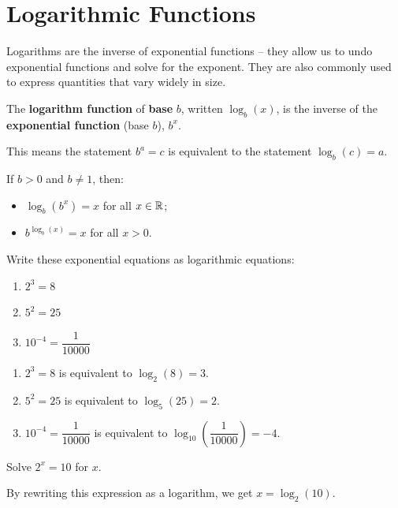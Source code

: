 \section{Logarithmic Functions}
\label{sec:log}

Logarithms are the inverse of exponential functions – they allow us to undo exponential functions and solve for the exponent. They are also commonly used to express quantities that vary widely in size.

\begin{definition}
The {\bf logarithm function} of {\bf base} $b$, written $\log_b(x)$, is the inverse of the {\bf exponential function} (base $b$), $b^x$.

This means the statement $b^a=c$ is equivalent to the statement $\log_b(c)=a$.
\end{definition}

\begin{theorem}
If $b>0$ and $b\neq 1$, then:
  \begin{itemize}
    \item $\log_b(b^x)=x$ for all $x\in\mathbb{R}$;
    \item $b^{\log_b(x)}=x$ for all $x>0$.
  \end{itemize}
\end{theorem}

\begin{example}
Write these exponential equations as logarithmic equations:
\begin{enumerate}[label={\alph*)}]
  \item $2^3=8$
  \item $5^2=25$
  \item $10^{-4}=\dfrac{1}{10000}$
\end{enumerate}
\begin{solution}
\begin{enumerate}[label={\alph*)}]
  \item $2^3=8$ is equivalent to $\log_2(8)=3$.
  \item $5^2=25$ is equivalent to $\log_5(25)=2$.
  \item $10^{-4}=\dfrac{1}{10000}$ is equivalent to $\log_{10}\left(\dfrac{1}{10000}\right)=-4$.
\end{enumerate}
\end{solution}\end{example}
\begin{example}
  Solve $2^x=10$ for $x$.

\begin{solution}  By rewriting this expression as a logarithm, we get $x=\log_2(10)$.
\end{solution}\end{example}

